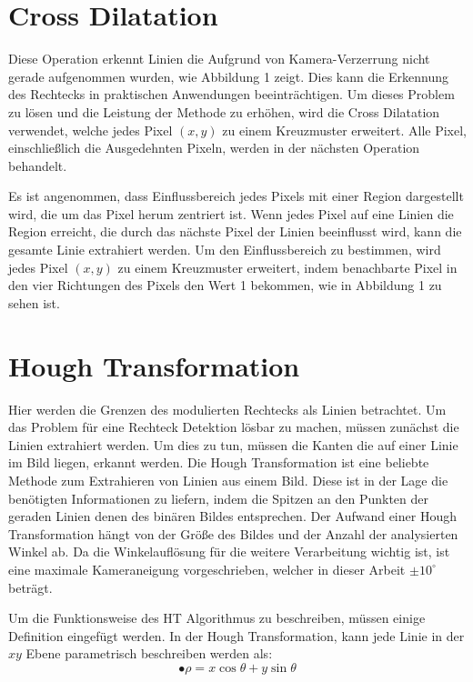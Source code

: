 \section{Cross Dilatation}

Diese Operation erkennt Linien die Aufgrund von Kamera-Verzerrung nicht gerade aufgenommen wurden, wie Abbildung 1 zeigt. Dies kann die Erkennung des Rechtecks in praktischen Anwendungen beeinträchtigen. Um dieses Problem zu lösen und die Leistung der Methode zu erhöhen, wird die Cross Dilatation verwendet, welche jedes Pixel $ (x,y) $ zu einem Kreuzmuster erweitert. Alle Pixel, einschließlich die Ausgedehnten Pixeln, werden in der nächsten Operation behandelt. 

Es ist angenommen, dass Einflussbereich jedes Pixels mit einer Region dargestellt wird, die um das Pixel herum zentriert ist. Wenn jedes Pixel auf eine Linien die Region erreicht, die durch das nächste Pixel der Linien beeinflusst wird, kann die gesamte Linie extrahiert werden. Um den Einflussbereich zu bestimmen, wird jedes Pixel $ (x,y) $ zu einem Kreuzmuster erweitert, indem benachbarte Pixel in den vier Richtungen des Pixels den Wert 1 bekommen, wie in Abbildung 1 zu sehen ist.

\section{Hough Transformation}

Hier werden die Grenzen des modulierten Rechtecks als Linien betrachtet. Um das Problem für eine Rechteck Detektion lösbar zu machen, müssen zunächst die Linien extrahiert werden. Um dies zu tun, müssen die Kanten die auf einer Linie im Bild liegen, erkannt werden. Die Hough Transformation ist eine beliebte Methode zum Extrahieren von Linien aus einem Bild. Diese ist in der Lage die benötigten Informationen zu liefern, indem die Spitzen an den Punkten der geraden Linien denen des binären Bildes entsprechen. Der Aufwand einer Hough Transformation hängt von der Größe des Bildes und der Anzahl der analysierten Winkel ab. Da die Winkelauflösung für die weitere Verarbeitung wichtig ist, ist eine maximale Kameraneigung vorgeschrieben, welcher in dieser Arbeit $ \pm 10^{\circ} $ beträgt.

Um die Funktionsweise des HT Algorithmus zu beschreiben, müssen einige Definition eingefügt werden. In der Hough Transformation, kann jede Linie in der $ xy $ Ebene parametrisch beschreiben werden als:
\begin{equation}
•  \rho = x \cos \theta + y \sin \theta
 \label{gl:Anglekoordinate}
\end{equation} 


